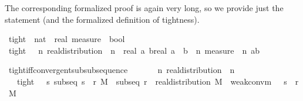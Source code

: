 \documentclass{article}
\theoremstyle{definition}
\begin{document}
The corresponding formalized proof is again very long, so we provide just the statement (and the formalized definition of tightness).

\medskip

\begin{isabellebody}
\isamarkupfalse%
\ tight\ {\isacharcolon}{\isacharcolon}\ {\isachardoublequoteopen}{\isacharparenleft}nat\ {\isasymRightarrow}\ real\ measure{\isacharparenright}\ {\isasymRightarrow}\ bool{\isachardoublequoteclose}\isanewline
{}\ {\isachardoublequoteopen}tight\ {\isasymmu}\ {\isasymequiv}\ {\isacharparenleft}{\isasymforall}n{\isachardot}\ real{\isacharunderscore}distribution\ {\isacharparenleft}{\isasymmu}\ n{\isacharparenright}{\isacharparenright}\ {\isasymand}\ {\isacharparenleft}{\isasymforall}{\isacharparenleft}{\isasymepsilon}{\isacharcolon}{\isacharcolon}real{\isacharparenright}{\isachargreater}{}{\isachardot}\ {\isasymexists}a\ b{\isacharcolon}{\isacharcolon}real{\isachardot}\ a\ {\isacharless}\ b\ {\isasymand}\ {\isacharparenleft}{\isasymforall}n{\isachardot}\ measure\ {\isacharparenleft}{\isasymmu}\ n{\isacharparenright}\ {\isacharbraceleft}a{\isacharless}{\isachardot}{\isachardot}b{\isacharbraceright}\ {\isachargreater}\ {}\ {\isacharminus}\ {\isasymepsilon}{\isacharparenright}{\isacharparenright}{\isachardoublequoteclose}
\end{isabellebody}

\medskip

\begin{isabellebody}
\isamarkupfalse%
\ tight{\isacharunderscore}iff{\isacharunderscore}convergent{\isacharunderscore}subsubsequence{\isacharcolon}\isanewline
\ \ \ {\isasymmu}\isanewline
\ \ \ {\isachardoublequoteopen}{\isasymAnd}n{\isachardot}\ real{\isacharunderscore}distribution\ {\isacharparenleft}{\isasymmu}\ n{\isacharparenright}{\isachardoublequoteclose}\isanewline
\ \ \ {\isachardoublequoteopen}tight\ {\isasymmu}\ {\isacharequal}\ {\isacharparenleft}{\isasymforall}s{\isachardot}\ subseq\ s\ {\isasymlongrightarrow}\ {\isacharparenleft}{\isasymexists}r{\isachardot}\ {\isasymexists}M{\isachardot}\ \ subseq\ r\ {\isasymand}\ real{\isacharunderscore}distribution\ M\ {\isasymand}\ weak{\isacharunderscore}conv{\isacharunderscore}m\ {\isacharparenleft}{\isasymmu}\ {\isasymcirc}\ s\ {\isasymcirc}\ r{\isacharparenright}\ M{\isacharparenright}{\isacharparenright}{\isachardoublequoteclose}
\end{isabellebody}
\end{document}
